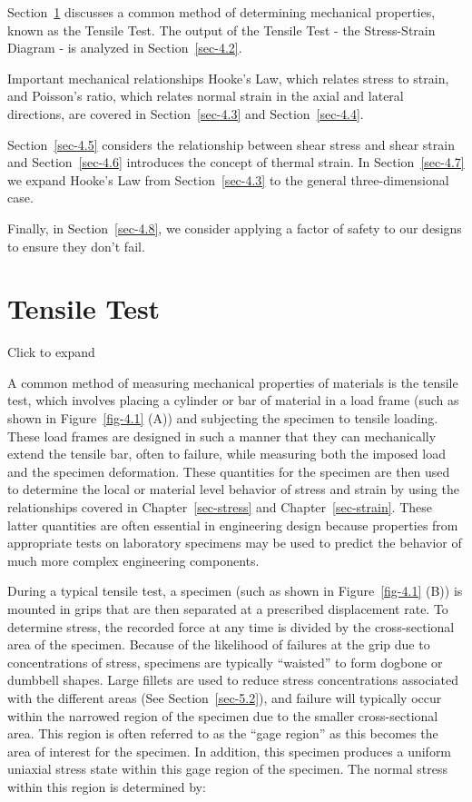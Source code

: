 \documentclass[
  letterpaper,
  DIV=11,
  numbers=noendperiod]{scrreprt}
\theoremstyle{definition}
\theoremstyle{remark}
\begin{document}
Section~\ref{sec-4.1} discusses a common method of determining
mechanical properties, known as the Tensile Test. The output of the
Tensile Test - the Stress-Strain Diagram - is analyzed in
Section~\ref{sec-4.2}.

Important mechanical relationships Hooke's Law, which relates stress to
strain, and Poisson's ratio, which relates normal strain in the axial
and lateral directions, are covered in Section~\ref{sec-4.3} and
Section~\ref{sec-4.4}.

Section~\ref{sec-4.5} considers the relationship between shear stress
and shear strain and Section~\ref{sec-4.6} introduces the concept of
thermal strain. In Section~\ref{sec-4.7} we expand Hooke's Law from
Section~\ref{sec-4.3} to the general three-dimensional case.

Finally, in Section~\ref{sec-4.8}, we consider applying a factor of
safety to our designs to ensure they don't fail.

\section{Tensile Test}\label{sec-4.1}

Click to expand

A common method of measuring mechanical properties of materials is the
tensile test, which involves placing a cylinder or bar of material in a
load frame (such as shown in Figure~\ref{fig-4.1} (A)) and subjecting
the specimen to tensile loading. These load frames are designed in such
a manner that they can mechanically extend the tensile bar, often to
failure, while measuring both the imposed load and the specimen
deformation. These quantities for the specimen are then used to
determine the local or material level behavior of stress and strain by
using the relationships covered in Chapter~\ref{sec-stress} and
Chapter~\ref{sec-strain}. These latter quantities are often essential in
engineering design because properties from appropriate tests on
laboratory specimens may be used to predict the behavior of much more
complex engineering components.

During a typical tensile test, a specimen (such as shown in
Figure~\ref{fig-4.1} (B)) is mounted in grips that are then separated at
a prescribed displacement rate. To determine stress, the recorded force
at any time is divided by the cross-sectional area of the specimen.
Because of the likelihood of failures at the grip due to concentrations
of stress, specimens are typically ``waisted'' to form dogbone or
dumbbell shapes. Large fillets are used to reduce stress concentrations
associated with the different areas (See Section~\ref{sec-5.2}), and
failure will typically occur within the narrowed region of the specimen
due to the smaller cross-sectional area. This region is often referred
to as the ``gage region'' as this becomes the area of interest for the
specimen. In addition, this specimen produces a uniform uniaxial stress
state within this gage region of the specimen. The normal stress within
this region is determined by:
\end{document}
